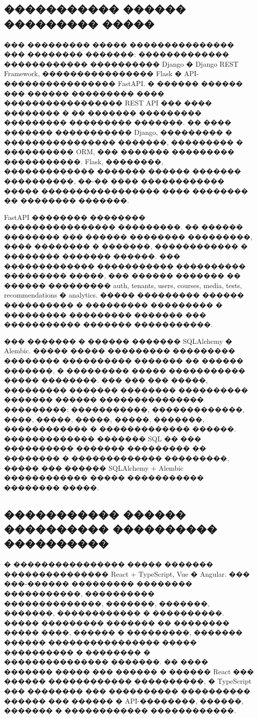 \subsection{����������� ������ ��������� �����}

��� ��������� ����� ��������������� ��� �������� �������: ������������� ������������ ���������� Django � Django REST Framework, ���������������� Flask � API-���������������� FastAPI. � ������ ������ ��� ������ ��������� ���� ����������������� REST API ��� ���� �������� � �� ������� ��������� ��������� ��������� �������. �� ���� ������� ����������� Django, ��������� � ���������������� �������, ��������� � ���������� ORM, ��� ������� ��������� �����������. Flask, ��������, ������������� ������� ������ ������� ����������, ��-�� ���� ������������ ����� ����������������� ���� �������� �� �������� �������\cite{fastapi_docs,django_rest_framework}.

FastAPI �������� �������� ���������������� ���������. �� ������ �������� ��� ������ �������� ���������, ���� �������� � �������, ������������ � �������� ������� ������. ��� ������������� ����������� ���������� ��������� �����, ��� ������ ������� �� ������ ��������� auth, tenants, users, courses, media, tests, recommendations � analytics. ����� ��������� ������ ���������� � ��������� ��������� � ��������� ��������� ������� ��� ����������� ������� �����������\cite{fastapi_docs}.

��� ������� � ������ ������� SQLAlchemy � Alembic\cite{sqlalchemy_docs}. ����� ����� ��������� ��������� �������� ���������� ������� �� ������ �������, � ��������� ����� ����������� ����� ��������. ��� ��� ��� �����, ��������� ������� �������� ���������� ������� ������ ��������������� ���������: �����������, �������������, ����, �����, �����, �����, �������, ������������ � ������������� ������. ������������� ������� SQL �� ��� ���������� ������� ��������� �� �������� � ������������� ���������, ����� ��� ������ SQLAlchemy + Alembic ������������ ����� ����������� �������� �����.

\subsection{����������� ������ ���������� ���������� ����������}

� ���������������� ����� ������� ��������������� React + TypeScript, Vue � Angular. ��� ���-������ ��������� �������� �����������, ���������� ��������������, �������, �������, �������, ������������ � ����������. ����� ��������� ������� �� �������� ����� ����, ������ � ���������, ������� ������ ���������������� ����� ���������� � �������� � ��������������� �������. �� ���� ������� ����� ��� ������ � ������ React ��� ������ ������������ ����������, � TypeScript ��� �������� ��� ���������� ���������� ������ ��� ������ � API-��������, ������, ������� � ������������ ������������\cite{react_docs,typescript_docs}.

